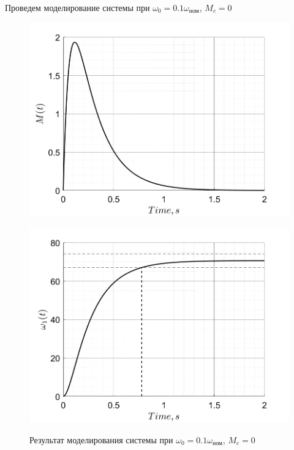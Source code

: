 Проведем моделирование системы при $\omega_0 = 0.1\omega_\text{ном}$, $M_c = 0$
\begin{figure}[!h]
    \centering
    \begin{minipage}{0.5\textwidth}
        \centering
        \includegraphics[width = \textwidth]{img/task11_M}
        \label{fig:img/task11_M}
    \end{minipage}%
    \begin{minipage}{0.5\textwidth}
        \centering
        \includegraphics[width = \textwidth]{img/task11_omega1}
        \label{fig:img/task11_omega1}
    \end{minipage}%
    \caption{Результат моделирования системы при $\omega_0 = 0.1\omega_\text{ном}$, $M_c = 0$}
\end{figure}

